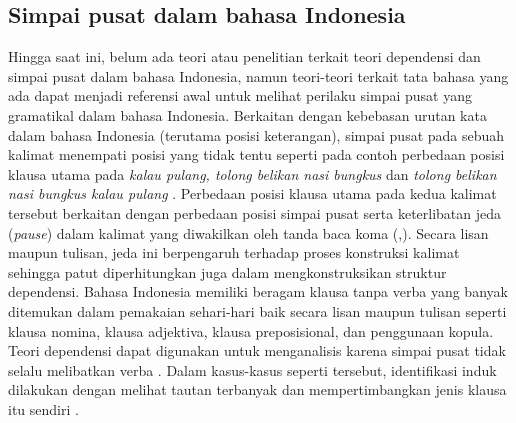 \subsection{Simpai pusat dalam bahasa Indonesia}
Hingga saat ini, belum ada teori atau penelitian terkait teori dependensi dan simpai pusat dalam bahasa Indonesia, namun teori-teori terkait tata bahasa yang ada dapat menjadi referensi awal untuk melihat perilaku simpai pusat yang gramatikal dalam bahasa Indonesia. Berkaitan dengan kebebasan urutan kata dalam bahasa Indonesia (terutama posisi keterangan), simpai pusat pada sebuah kalimat menempati posisi yang tidak tentu seperti pada contoh perbedaan posisi klausa utama pada \textit{kalau pulang, tolong belikan nasi bungkus} dan \textit{tolong belikan nasi bungkus kalau pulang} \citep{sneddon2010indonesian}. Perbedaan posisi klausa utama pada kedua kalimat tersebut berkaitan dengan perbedaan posisi simpai pusat serta keterlibatan jeda (\textit{pause}) dalam kalimat yang diwakilkan oleh tanda baca koma (,). Secara lisan maupun tulisan, jeda ini berpengaruh terhadap proses konstruksi kalimat sehingga patut diperhitungkan juga dalam mengkonstruksikan struktur dependensi. 
Bahasa Indonesia memiliki beragam klausa tanpa verba yang banyak ditemukan dalam pemakaian sehari-hari baik secara lisan maupun tulisan \citep{sneddon2010indonesian} seperti klausa nomina, klausa adjektiva, klausa preposisional, dan penggunaan kopula. Teori dependensi dapat digunakan untuk menganalisis karena simpai pusat tidak selalu melibatkan verba \citep{tesniere1959elements}. Dalam kasus-kasus seperti tersebut, identifikasi induk dilakukan dengan melihat tautan terbanyak \citep{tesniere1959elements} dan mempertimbangkan jenis klausa itu sendiri \citep{sneddon2010indonesian}.